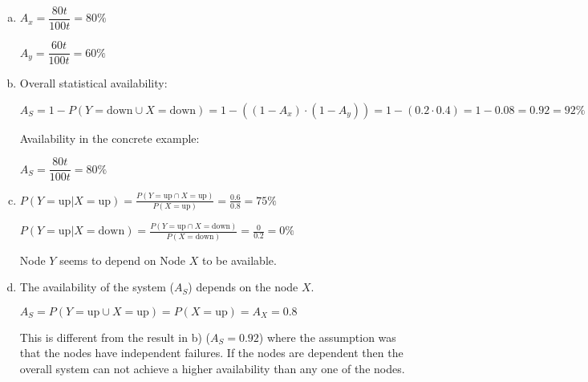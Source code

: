 \documentclass{scrartcl}
\begin{document}
\begin{enumerate}[a)]
	\item $ A_x = \dfrac{80t}{100t} = 80\% $

		$ A_y = \dfrac{60t}{100t} = 60\%$

	\item Overall statistical availability:

		$ A_S = 1 - P(Y=\text{down} \cup X=\text{down}) = 1 - ((1 - A_x) \cdot (1 - A_y)) = 1 - (0.2 \cdot 0.4) = 1 - 0.08 = 0.92 = 92\%$

		Availability in the concrete example:

		$ A_S = \dfrac{80t}{100t} = 80\% $

	\item $ P(Y=\text{up}|X=\text{up}) = \frac{P(Y=\text{up} \cap X=\text{up})}{P(X=\text{up})} = \frac{0.6}{0.8} = 75\% $

		$ P(Y=\text{up}|X=\text{down}) = \frac{P(Y=\text{up} \cap X=\text{down})}{P(X=\text{down})} = \frac{0}{0.2} = 0\% $

		Node $Y$ seems to depend on Node $X$ to be available.

	\item The availability of the system ($ A_S $) depends on the node $X$.

		$ A_S = P(Y=\text{up} \cup X=\text{up}) = P(X=\text{up}) = A_X = 0.8 $

		This is different from the result in b) ($ A_S = 0.92 $) where the assumption was that the nodes have independent failures.
		If the nodes are dependent then the overall system can not achieve a higher availability than any one of the nodes.

\end{enumerate}
\end{document}
